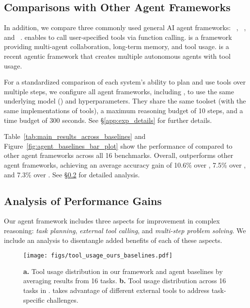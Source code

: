 \subsection{Comparisons with Other Agent Frameworks}

In addition, we compare three commonly used general AI agent frameworks: \gptplugin~\cite{gpt4oplugin}, \langchain~\cite{langchain}, and \autogen~\cite{autogen}. \gptplugin enables \gpt to call user-specified tools via function calling. \langchain is a framework providing multi-agent collaboration, long-term memory, and tool usage. \autogen is a recent agentic framework that creates multiple autonomous agents with tool usage.

For a standardized comparison of each system’s ability to plan and use tools over multiple steps, we configure all agent frameworks, including \model, to use the same underlying model (\gpt) and hyperparameters. They share the same toolset (with the same implementations of tools), a maximum reasoning budget of 10 steps, and a time budget of 300 seconds. See \S \ref{app:exp_details} for further details.

Table~\ref{tab:main_results_across_baselines} and Figure~\ref{fig:agent_baselines_bar_plot} show the performance of \model compared to other agent frameworks across all 16 benchmarks. Overall, \model outperforms other agent frameworks, achieving an average accuracy gain of 10.6\% over \autogen, 7.5\% over \gptplugin, and 7.3\% over \langchain. See \S \ref{sec:analysis_of_gains} for detailed analysis.

\subsection{Analysis of Performance Gains}
\label{sec:analysis_of_gains}
Our agent framework includes three aspects for improvement in complex reasoning: \textit{task planning}, \textit{external tool calling}, and \textit{multi-step problem solving}. We include an analysis to disentangle added benefits of each of these aspects. 

\begin{figure*}[th!]
    \centering
    \texttt{[image: figs/tool\_usage\_ours\_baselines.pdf]}
    \vspace{-4mm}
    \caption{\textbf{a.} Tool usage distribution in our \model framework and agent baselines by averaging results from 16 tasks. \textbf{b.} Tool usage distribution across 16 tasks in \model. \model takes advantage of different external tools to address task-specific challenges.}
    \label{fig:tool_usage_ours_baselines}
\end{figure*}

